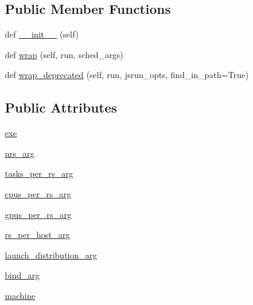 \subsection*{Public Member Functions}
\begin{DoxyCompactItemize}
\item 
def \hyperlink{classcodar_1_1savanna_1_1runners_1_1_summit_runner_ae02c57d99333e7987709dacee9bc1496}{\+\_\+\+\_\+init\+\_\+\+\_\+} (self)
\item 
def \hyperlink{classcodar_1_1savanna_1_1runners_1_1_summit_runner_ad754a3642a7d7e3dfcac4e6956ec9cbc}{wrap} (self, run, sched\+\_\+args)
\item 
def \hyperlink{classcodar_1_1savanna_1_1runners_1_1_summit_runner_a79042d5ab820ce5cc55292e2c3338994}{wrap\+\_\+deprecated} (self, run, jsrun\+\_\+opts, find\+\_\+in\+\_\+path=True)
\end{DoxyCompactItemize}
\subsection*{Public Attributes}
\begin{DoxyCompactItemize}
\item 
\hyperlink{classcodar_1_1savanna_1_1runners_1_1_summit_runner_a6dc6cbd63d546efb61ca8299bb186ec3}{exe}
\item 
\hyperlink{classcodar_1_1savanna_1_1runners_1_1_summit_runner_acaf90a041d1187271116f984ff8d0206}{nrs\+\_\+arg}
\item 
\hyperlink{classcodar_1_1savanna_1_1runners_1_1_summit_runner_a7ab533a9058a4575468d58026c169992}{tasks\+\_\+per\+\_\+rs\+\_\+arg}
\item 
\hyperlink{classcodar_1_1savanna_1_1runners_1_1_summit_runner_add0e4e1f69688a9aaaeb19dbeef50b1d}{cpus\+\_\+per\+\_\+rs\+\_\+arg}
\item 
\hyperlink{classcodar_1_1savanna_1_1runners_1_1_summit_runner_a10b2fdfd7b6b407ab4bc218ededcbc0a}{gpus\+\_\+per\+\_\+rs\+\_\+arg}
\item 
\hyperlink{classcodar_1_1savanna_1_1runners_1_1_summit_runner_ace56b0a9e2920543866021bb150a55a8}{rs\+\_\+per\+\_\+host\+\_\+arg}
\item 
\hyperlink{classcodar_1_1savanna_1_1runners_1_1_summit_runner_a0550589f1ba354d1a0fd645023153ec1}{launch\+\_\+distribution\+\_\+arg}
\item 
\hyperlink{classcodar_1_1savanna_1_1runners_1_1_summit_runner_a92e82ecf812eb3c701fc855cda464c38}{bind\+\_\+arg}
\item 
\hyperlink{classcodar_1_1savanna_1_1runners_1_1_summit_runner_a968e40e2579e317df88c8da777e7be0f}{machine}
\end{DoxyCompactItemize}


